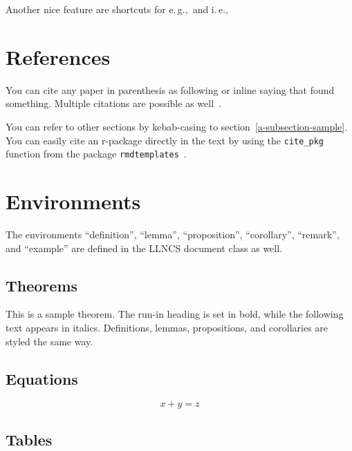 \documentclass[runningheads]{llncs}
\newcommand{\eg}{e.\,g.,\ }
\newcommand{\ie}{i.\,e.,\ }
\begin{document}
Another nice feature are shortcuts for \eg and \ie 

\hypertarget{references}{%
\section{References}\label{references}}

You can cite any paper in parenthesis as following
\autocite{valdez2017priming} or inline saying that
\textcite{valdez2017priming} found something. Multiple citations are
possible as well~\autocite{valdez2017priming,valdez2019users}.

You can refer to other sections by kebab-casing to
section~\ref{a-subsection-sample}. You can easily cite an r-package
directly in the text by using the \texttt{cite\_pkg} function from the
package \texttt{rmdtemplates}~\autocite{R-rmdtemplates}.

\hypertarget{environments}{%
\section{Environments}\label{environments}}

The environments \enquote{definition}, \enquote{lemma},
\enquote{proposition}, \enquote{corollary}, \enquote{remark}, and
\enquote{example} are defined in the LLNCS document class as well.

\hypertarget{theorems}{%
\subsection{Theorems}\label{theorems}}

\begin{theorem}
This is a sample theorem. The run-in heading is set in bold, while
the following text appears in italics. Definitions, lemmas,
propositions, and corollaries are styled the same way.
\end{theorem}

\hypertarget{equations}{%
\subsection{Equations}\label{equations}}

\begin{equation}
x + y = z
\end{equation}

\hypertarget{tables}{%
\subsection{Tables}\label{tables}}
\end{document}
